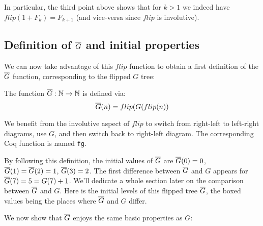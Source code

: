 \documentclass[a4paper,11pt]{article}
\begin{document}
In particular, the third point above shows that for $k>1$
we indeed have $flip(1+F_k) = F_{k+1}$ (and vice-versa since $flip$
is involutive).

\subsection{Definition of $\overline{G}$ and initial properties}

We can now take advantage of this $flip$ function to obtain
a first definition of the $\overline{G}$ function, corresponding to the
flipped $G$ tree:

\begin{definition}
The function $\overline{G} : \mathbb{N}\to\mathbb{N}$ is defined via:
$$\overline{G}(n) = flip(G(flip(n))$$
\end{definition}

We benefit from the involutive aspect of $flip$ to switch
from right-left to left-right diagrams, use $G$, and then
switch back to right-left diagram. The corresponding Coq function
is named {\tt fg}.

By following this definition, the initial values of $\overline{G}$ are
$\overline{G}(0)=0$, $\overline{G}(1)=\overline{G}(2)=1$, $\overline{G}(3)=2$. The first difference
between $\overline{G}$ and $G$ appears for $\overline{G}(7)=5=G(7)+1$. We'll dedicate a
whole section later on the comparison between $\overline{G}$ and $G$.
Here is the initial levels of this flipped tree $\overline{G}$,
the boxed values being the places where $\overline{G}$ and $G$ differ.

\bigskip


We now show that $\overline{G}$ enjoys the same basic properties as $G$:
\end{document}
